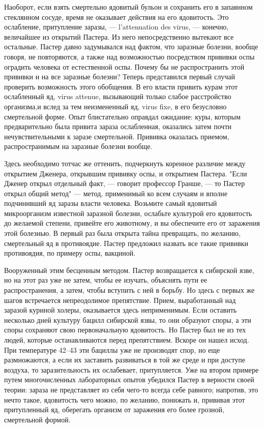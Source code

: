 Наоборот,  если взять  смертельно ядовитый  бульон и  сохранить его  в
запаянном  стеклянном  сосуде,  время  не оказывает  действия  на  его
ядовитость.  Это  ослабление,  притупление заразы,  ---  l'attenuation
des  virus,  --- конечно,  величайшее  из  открытий Пастера.  Из  него
непосредственно вытекают  все остальные. Пастер давно  задумывался над
фактом, что заразные  болезни, вообще говоря, не  повторяются, а также
над  возможностью  посредством  прививки  оспы  оградить  человека  от
естественной  оспы. Почему  бы не  распространить этой  прививки и  на
все  заразные болезни?  Теперь  представился  первый случай  проверить
возможность  этого   обобщения.  В  его  власти   привить  курам  этот
ослабленный яд,  virus attenue, вызывающий только  слабое расстройство
организма,и вслед за тем неизмененный яд, virus fixe, в его безусловно
смертельной форме. Опыт блистательно  оправдал ожидание: куры, которым
предварительно была привита зараза  ослабленная, оказались затем почти
нечувствительными  к заразе  смертельной. Прививка  оказалась приемом,
распространимым на заразные болезни вообще.

Здесь  необходимо тотчас  же оттенить,  подчеркнуть коренное  различие
между открытием Дженера, открывшим прививку оспы, и открытием Пастера.
"Если Дженер открыл отдельный факт,  --- говорит профессор Гранше, ---
то Пастер  открыл общий метод"  --- метод, применимый ко  всем случаям
и  вполне  подчинивший  яд  заразы  власти  человека.  Возьмите  самый
ядовитый микроорганизм известной  заразной болезни, ослабьте культурой
его  ядовитость до  желаемой  степени, привейте  его  животному, и  вы
обеспечите его от  заражения этой болезнью. В первый  раз была открыта
тайна  превращать, по  желанию, смертельный  яд в  противоядие. Пастер
предложил  назвать все  такие прививки  противоядия, по  примеру оспы,
вакциной.

Вооруженный этим  бесценным методом.  Пастер возвращается  к сибирской
язве,  но на  этот  раз  уже не  затем,  чтобы  ее изучать,  объяснять
пути  ее распространения,  а затем,  чтобы  вступить с  ней в  борьбу.
Но  здесь с  первых  же шагов  встречается непреодолимое  препятствие.
Прием,  выработанный над  заразой  куриной  холеры, оказывается  здесь
неприменимым. Если  оставить несколько дней культуру  бацилл сибирской
язвы, то они образуют споры, а эти споры сохраняют свою первоначальную
ядовитость. Но  Пастер был  не из  тех людей,  которые останавливаются
перед препятствием. Вскоре он нашел  исход. При температуре 42--43 эти
бациллы  уже  не производят  спор,  но  еще  размножаются, а  если  их
заставить  развиваться  в той  же  среде  и  при доступе  воздуха,  то
заразительность  их ослабевает,  притупляется. Уже  на втором  примере
путем многочисленных  лабораторных опытов  убедился Пастер  в верности
своей  теории: зараза  не  представляет из  себя  чего-то всегда  себе
равного; напротив, это нечто такое, ядовитость чего можно, по желанию,
понижать  и,  прививая этот  притупленный  яд,  оберегать организм  от
заражения его более грозной, смертельной формой.

